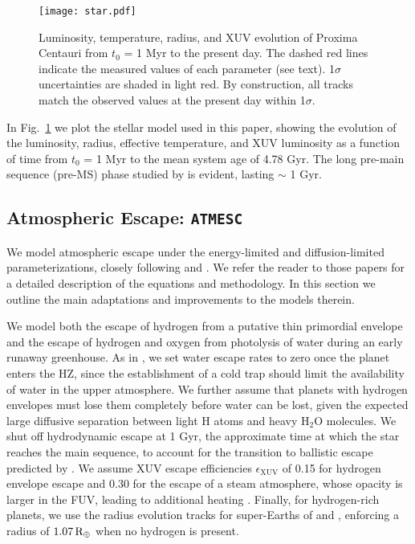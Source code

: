 \documentclass[preprint,12pt]{aastex}
\def\rearth{{\rm\,R_\oplus}}
\def\atmesc{\texttt{\footnotesize{ATMESC}}\xspace}
\begin{document}
\begin{figure}[ht]
\centering
\texttt{[image: star.pdf]}
\caption{Luminosity, temperature, radius, and XUV evolution of Proxima
  Centauri from $t_0$ = 1 Myr to the present day. The dashed red lines
  indicate the measured values of each parameter (see text). 1$\sigma$
  uncertainties are shaded in light red. By construction, all tracks
  match the observed values at the present day within 1$\sigma$.}
\label{fig:stellar:evol}
\end{figure}

In Fig.~\ref{fig:stellar:evol} we plot the stellar model used in this
paper, showing the evolution of the luminosity, radius, effective
temperature, and XUV luminosity as a function of time from $t_0$ = 1
Myr to the mean system age of 4.78 Gyr. The long pre-main sequence
(pre-MS) phase studied by \cite{LugerBarnes15} is evident, lasting $\sim$ 
1 Gyr.

\subsection{Atmospheric Escape: \atmesc}
\label{sec:models:atmesc}

We model atmospheric escape under the energy-limited
\citep{Watson81,Erkaev07} and diffusion-limited \citep{Hunten73}
parameterizations, closely following \cite{Luger15} and
\cite{LugerBarnes15}. We refer the reader to those papers for a
detailed description of the equations and methodology. In this section
we outline the main adaptations and improvements to the models
therein.

We model both the escape of hydrogen from a putative thin primordial
envelope and the escape of hydrogen and oxygen from photolysis of
water during an early runaway greenhouse. As in \cite{LugerBarnes15},
we set water escape rates to zero once the planet enters the HZ, since
the establishment of a cold trap should limit the availability of
water in the upper atmosphere. We further assume that planets with
hydrogen envelopes must lose them completely before water can be lost,
given the expected large diffusive separation between light H atoms
and heavy H$_2$O molecules.  We shut off hydrodynamic escape at 1 Gyr,
the approximate time at which the star reaches the main sequence, to
account for the transition to ballistic escape predicted by
\cite{OwenMohanty16}. We assume XUV escape efficiencies
$\epsilon_\mathrm{XUV}$ of 0.15 for hydrogen envelope escape and 0.30
for the escape of a steam atmosphere, whose opacity is larger in the
FUV, leading to additional heating \citep{Sekiya81}. Finally, for
hydrogen-rich planets, we use the radius evolution tracks for
super-Earths of \cite{Lopez12} and \cite{LopezFortney14}, enforcing a
radius of $1.07 \rearth$ when no hydrogen is present.
\end{document}
